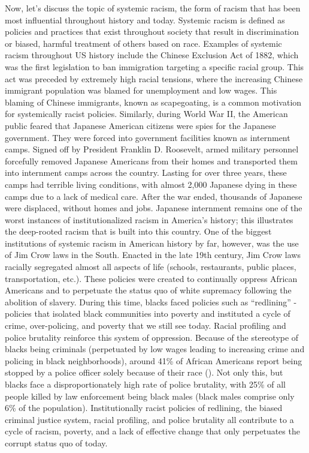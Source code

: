 \documentclass[12pt, a4paper, twoside]{article}
\begin{document}
Now, let's discuss the topic of systemic racism, the form of racism that has been most influential throughout history and today. Systemic racism is defined as policies and practices that exist throughout society that result in discrimination or biased, harmful treatment of others based on race. Examples of systemic racism throughout US history include the Chinese Exclusion Act of 1882, which was the first legislation to ban immigration targeting a specific racial group. This act was preceded by extremely high racial tensions, where the increasing Chinese immigrant population was blamed for unemployment and low wages. This blaming of Chinese immigrants, known as scapegoating, is a common motivation for systemically racist policies. Similarly, during World War II, the American public feared that Japanese American citizens were spies for the Japanese government. They were forced into government facilities known as internment camps. Signed off by President Franklin D. Roosevelt, armed military personnel forcefully removed Japanese Americans from their homes and transported them into internment camps across the country. Lasting for over three years, these camps had terrible living conditions, with almost 2,000 Japanese dying in these camps due to a lack of medical care. After the war ended, thousands of Japanese were displaced, without homes and jobs. Japanese internment remains one of the worst instances of institutionalized racism in America’s history; this illustrates the deep-rooted racism that is built into this country. One of the biggest institutions of systemic racism in American history by far, however, was the use of Jim Crow laws in the South. Enacted in the late 19th century, Jim Crow laws racially segregated almost all aspects of life (schools, restaurants, public places, transportation, etc.). These policies were created to continually oppress African Americans and to perpetuate the status quo of white supremacy following the abolition of slavery. During this time, blacks faced policies such as “redlining” - policies that isolated black communities into poverty and instituted a cycle of crime, over-policing, and poverty that we still see today. Racial profiling and police brutality reinforce this system of oppression. Because of the stereotype of blacks being criminals (perpetuated by low wages leading to increasing crime and policing in black neighborhoods), around 41\% of African Americans report being stopped by a police officer solely because of their race (\cite{stewart2024}). Not only this, but blacks face a disproportionately high rate of police brutality, with 25\% of all people killed by law enforcement being black males (black males comprise only 6\% of the population). Institutionally racist policies of redlining, the biased criminal justice system, racial profiling, and police brutality all contribute to a cycle of racism, poverty, and a lack of effective change that only perpetuates the corrupt status quo of today.
\end{document}
